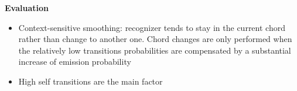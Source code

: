 \documentclass{scrartcl}
\begin{document}
\begin{itemize}
\begin{itemize}
        \end{itemize}
\end{itemize}
\textbf{Evaluation}
\begin{itemize}
    \item
        Context-sensitive smoothing: recognizer tends to stay in the current chord rather than change to another one. Chord changes are only performed when the relatively low transitions probabilities are compensated by a substantial increase of emission probability
    \item
        High self transitions are the main factor
\end{itemize}
\end{document}
